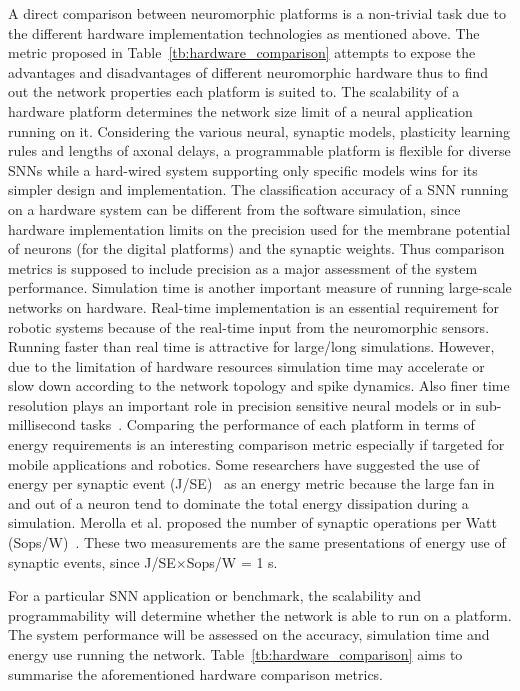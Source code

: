 \documentclass{frontiersENG} %
\begin{document}
A direct comparison between neuromorphic platforms is a non-trivial task due to the different hardware implementation technologies as mentioned above.
The metric proposed in Table~\ref{tb:hardware_comparison} attempts to expose the advantages and disadvantages of different neuromorphic hardware thus to find out the network properties each platform is suited to.
The scalability of a hardware platform determines the network size limit of a neural application running on it.
Considering the various neural, synaptic models, plasticity learning rules and lengths of axonal delays, a programmable platform is flexible for diverse SNNs while a hard-wired system supporting only specific models wins for its simpler design and implementation.
The classification accuracy of a SNN running on a hardware system can be different from the software simulation, since hardware implementation limits on the precision used for the membrane potential of neurons (for the digital platforms) and the synaptic weights.
Thus comparison metrics is supposed to include precision as a major assessment of the system performance.
Simulation time is another important measure of running large-scale networks on hardware.
Real-time implementation is an essential requirement for robotic systems because of the real-time input from the neuromorphic sensors.
Running faster than real time is attractive for large/long simulations.
However, due to the limitation of hardware resources simulation time may accelerate or slow down according to the network topology and spike dynamics.
Also finer time resolution plays an important role in precision sensitive neural models or in sub-millisecond tasks~\citep{lagorce2015breaking}.
Comparing the performance of each platform in terms of energy requirements is an interesting comparison metric especially if targeted for mobile applications and robotics. Some researchers have suggested the use of energy per synaptic event (J/SE)~\citep{sharp2012power,stromatias2013power} as an energy metric because the large fan in and out of a neuron tend to dominate the total energy dissipation during a simulation. Merolla et al. proposed the number of synaptic operations per Watt (Sops/W)~\citep{merolla2014million}.
These two measurements are the same presentations of energy use of synaptic events, since J/SE$\times$Sops/W = 1 s. 

For a particular SNN application or benchmark, the scalability and programmability will determine whether the network is able to run on a platform.
The system performance will be assessed on the accuracy, simulation time and energy use running the network. 
Table~\ref{tb:hardware_comparison} aims to summarise the aforementioned hardware comparison metrics.
\end{document}
